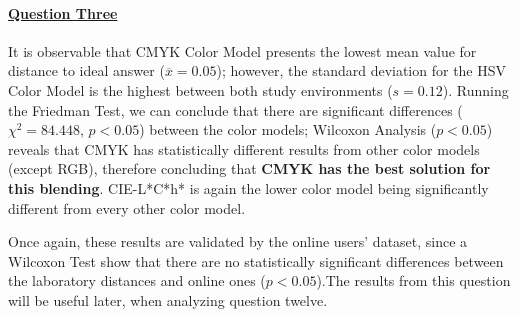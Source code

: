 \paragraph{\ul{Question Three}}
%
It is observable that CMYK Color Model presents the lowest mean value for distance to ideal answer ($\overline{x} = 0.05$); however,
the standard deviation for the HSV Color Model is the highest between both study environments ($s = 0.12$).
Running the Friedman Test, we can conclude that there are significant differences ($\chi^2 = 84.448$, $p < 0.05$) between the color models;
Wilcoxon Analysis ($p < 0.05$) reveals that CMYK has statistically different results from other color models (except RGB), therefore concluding that
\textbf{CMYK has the best solution for this blending}. CIE-L*C*h* is again the lower color model being
significantly different from every other color model. \par
%
Once again, these results are validated by the online users' dataset, since a Wilcoxon Test show that there are no statistically significant differences between the laboratory
distances and online ones ($p < 0.05$).The results from this question will be useful later, when analyzing question twelve.
%
